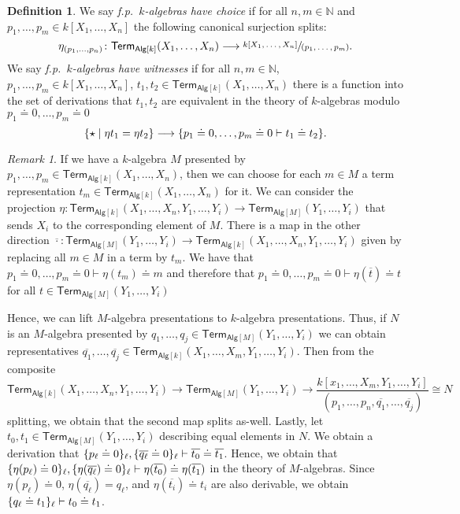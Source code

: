 \documentclass[10pt,a4paper]{article}
\theoremstyle{definition}
\newtheorem{definition}[theorem]{Definition}
\theoremstyle{remark}
\newtheorem{remark}[theorem]{Remark}
\newcommand{\nats}{\mathbb{N}}
\newcommand{\Alg}{\mathsf{Alg}}
\DeclarePairedDelimiter\set{\{}{\}}
\newcommand\Term{\mathsf{Term}}
\begin{document}
\begin{definition}
  We say \emph{f.p.~\(k\)-algebras have choice} if for all \(n, m \in \nats\) and \(p_1, \ldots, p_m \in k[X_1, \ldots, X_n]\) the following canonical surjection splits:
  \[
    \eta_{(p_1, \ldots, p_n)} \colon \Term_{\Alg[k]}(X_1, \ldots, X_n) \longrightarrow \sfrac{k[X_1, \ldots, X_n]}{(p_1, \ldots, p_m)}.
  \]
  We say \emph{f.p.~\(k\)-algebras have witnesses} if for all \(n, m \in \nats\), \(p_1, \ldots, p_m \in k[X_1, \ldots, X_n]\), \(t_1, t_2 \in \Term_{\Alg[k]}(X_1, \ldots, X_n)\) there is a function into the set of derivations that \(t_1, t_2\) are equivalent in the theory of \(k\)-algebras modulo \(p_1 \doteq 0, \ldots, p_m \doteq 0\)
  \[
    \set{\star \mid \eta t_1 = \eta t_2 } \longrightarrow \set{ p_1 \doteq 0, \ldots, p_m \doteq 0 \vdash t_1 \doteq t_2 }. 
  \]
\end{definition}
\begin{remark}\label{rem:choice-and-witness-property-descend}
  If we have a \(k\)-algebra \(M\) presented by \(p_1, \ldots, p_m \in \Term_{\Alg[k]}(X_1, \ldots, X_n)\), then we can choose for each \(m \in M\) a term representation \(t_m \in \Term_{\Alg[k]}(X_1, \ldots, X_n)\) for it.
  We can consider the projection \(\eta \colon \Term_{\Alg[k]}(X_1, \ldots, X_n, Y_1, \ldots, Y_i) \to \Term_{\Alg[M]}(Y_1, \ldots, Y_i)\) that sends \(X_i\) to the corresponding element of \(M\).
  There is a map in the other direction \(\overline\cdot \colon \Term_{\Alg[M]}(Y_1, \ldots, Y_i) \to \Term_{\Alg[k]}(X_1, \ldots, X_n, Y_1, \ldots, Y_i)\) given by replacing all \(m \in M\) in a term by \(t_m\).
  We have that \(p_1 \doteq 0, \ldots, p_m \doteq 0 \vdash \eta(t_m) \doteq m\) and therefore that \(p_1 \doteq 0, \ldots, p_m \doteq 0 \vdash \eta(\overline{t}) \doteq t\) for all \(t \in \Term_{\Alg[M]}(Y_1, \ldots, Y_i)\)
  
  Hence, we can lift \(M\)-algebra presentations to \(k\)-algebra presentations.
  Thus, if \(N\) is an \(M\)-algebra presented by \(q_1, \ldots, q_j \in \Term_{\Alg[M]}(Y_1, \ldots, Y_i)\) we can obtain representatives \(\overline{q_1}, \ldots, \overline{q_j} \in \Term_{\Alg[k]}(X_1, \ldots, X_m, Y_1, \ldots, Y_i)\).
  Then from the composite
  \[
    \Term_{\Alg[k]}(X_1, \ldots, X_n, Y_1, \ldots, Y_i) \longrightarrow \Term_{\Alg[M]}(Y_1, \ldots, Y_i) \longrightarrow \frac{k[x_1, \ldots, X_m, Y_1, \ldots, Y_i]}{(p_1, \ldots, p_n, \overline{q_1}, \ldots, \overline{q_j})} \cong N
  \]
  splitting, we obtain that the second map splits as-well.
  Lastly, let \(t_0, t_1 \in \Term_{\Alg[M]}(Y_1, \ldots, Y_i)\) describing equal elements in \(N\).
  We obtain a derivation that \(\set{p_\ell \doteq 0}_\ell, \set{\overline{q_\ell} \doteq 0}_\ell \vdash \overline{t_0} \doteq \overline{t_1}\).
  Hence, we obtain that \(\set{\eta(p_\ell) \doteq 0}_\ell, \set{\eta(\overline{q_\ell}) \doteq 0}_\ell \vdash \eta(\overline{t_0}) \doteq \eta(\overline{t_1})\) in the theory of \(M\)-algebras.
  Since \(\eta(p_\ell) \doteq 0\), \(\eta(\overline{q_\ell}) = q_\ell\), and \(\eta(\overline{t_i}) \doteq t_i\) are also derivable, we obtain \(\set{q_\ell \doteq t_1}_\ell \vdash t_0 \doteq t_1\).
\end{remark}
\end{document}
